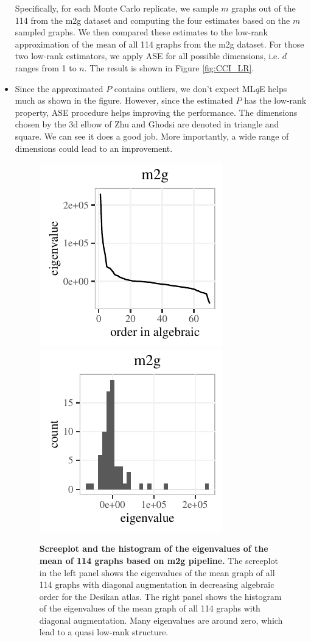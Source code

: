 \documentclass[a4paper]{article}
\begin{document}
\begin{itemize}
Specifically, for each Monte Carlo replicate, we sample $m$ graphs out of the 114 from the m2g dataset and computing the four estimates based on the $m$ sampled graphs. We then compared these estimates to the low-rank approximation of the mean of all 114 graphs from the m2g dataset.
For those two low-rank estimators, we apply ASE for all possible dimensions, i.e. $d$ ranges from 1 to $n$. The result is shown in Figure \ref{fig:CCI_LR}.
\item Since the approximated $P$ contains outliers, we don't expect ML$q$E helps much as shown in the figure. However, since the estimated $P$ has the low-rank property, ASE procedure helps improving the performance. The dimensions chosen by the 3d elbow of Zhu and Ghodsi are denoted in triangle and square. We can see it does a good job. More importantly, a wide range of dimensions could lead to an improvement.

\begin{figure}[!htbp]
\centering
\includegraphics[height=.2\textheight]{screeplot_m2g.pdf}
\includegraphics[height=.2\textheight]{hist_m2g.pdf}
\caption{{\bf Screeplot and the histogram of the eigenvalues of the  mean of 114 graphs based on m2g pipeline.}
The screeplot in the left panel shows the eigenvalues of the mean graph of all 114 graphs with diagonal augmentation in decreasing algebraic order for the Desikan atlas. The right panel shows the histogram of the eigenvalues of the mean graph of all 114 graphs with diagonal augmentation. Many eigenvalues are around zero, which lead to a quasi low-rank structure.
}
\label{fig:screehist}
\end{figure}


\end{itemize}
\end{document}

